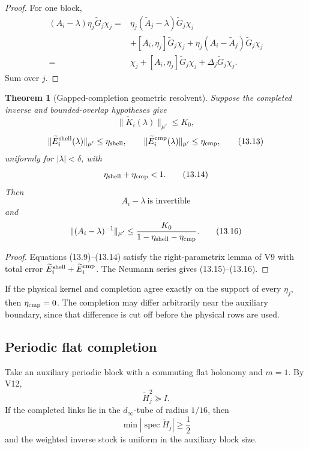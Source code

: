 \documentclass[11pt]{article}
\newtheorem{theorem}{Theorem}[section]
\newcommand{\spec}{\operatorname{spec}}
\begin{document}
\begin{proof}
For one block,
\[
\begin{split}
 (A_i-\lambda)\eta_j\widetilde G_j\chi_j
 ={}&
 \eta_j(\widetilde A_j-\lambda)\widetilde G_j\chi_j\\
 &+[A_i,\eta_j]\widetilde G_j\chi_j
 +\eta_j(A_i-\widetilde A_j)\widetilde G_j\chi_j\\
 ={}&
 \chi_j+[A_i,\eta_j]\widetilde G_j\chi_j
 +\Delta_j\widetilde G_j\chi_j.
\end{split}
\]
Sum over \(j\).
\end{proof}

\begin{theorem}[Gapped-completion geometric resolvent]
\label{thm:v11v13-completed-resolvent}
Suppose the completed inverse and bounded-overlap hypotheses give
\[
 \|\widetilde K_i(\lambda)\|_{\mu'}\leq K_0,
 \tag{13.12}
\]
\[
 \|\widetilde E_i^{\rm shell}(\lambda)\|_{\mu'}
 \leq\eta_{\rm shell},
 \qquad
 \|\widetilde E_i^{\rm cmp}(\lambda)\|_{\mu'}
 \leq\eta_{\rm cmp},
 \tag{13.13}
\]
uniformly for \(|\lambda|<\delta\), with
\[
 \eta_{\rm shell}+\eta_{\rm cmp}<1.
 \tag{13.14}
\]
Then
\[
 A_i-\lambda\ \text{is invertible}
 \tag{13.15}
\]
and
\[
 \|(A_i-\lambda)^{-1}\|_{\mu'}
 \leq
 \frac{K_0}{1-\eta_{\rm shell}-\eta_{\rm cmp}}.
 \tag{13.16}
\]
\end{theorem}

\begin{proof}
Equations (13.9)--(13.14) satisfy the right-parametrix lemma of V9 with
total error
\(\widetilde E_i^{\rm shell}+\widetilde E_i^{\rm cmp}\).
The Neumann series gives (13.15)--(13.16).
\end{proof}

If the physical kernel and completion agree exactly on the support of
every \(\eta_j\), then \(\eta_{\rm cmp}=0\).  The completion may differ
arbitrarily near the auxiliary boundary, since that difference is cut off
before the physical rows are used.

\subsection{Periodic flat completion}

Take an auxiliary periodic block with a commuting flat holonomy and
\(m=1\).  By V12,
\[
 \widetilde H_{j}^2\succeq I.
 \tag{13.17}
\]
If the completed links lie in the \(d_\infty\)-tube of radius \(1/16\),
then
\[
 \min|\spec\widetilde H_j|\geq\frac12
 \tag{13.18}
\]
and the weighted inverse stock is uniform in the auxiliary block size.
\end{document}
